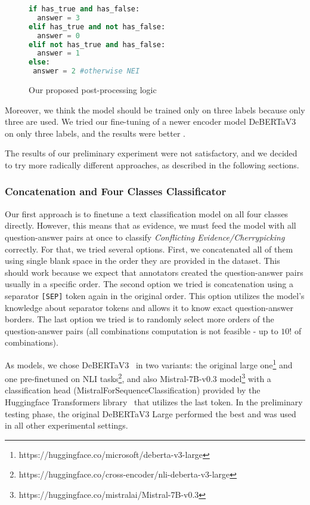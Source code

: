 \begin{figure}
    \begin{lstlisting}[language=Python, frame=single]
if has_true and has_false:
  answer = 3
elif has_true and not has_false:
  answer = 0
elif not has_true and has_false:
  answer = 1
else:
 answer = 2 #otherwise NEI
        \end{lstlisting}
    \caption{Our proposed post-processing logic} 
    \label{lst:post-processing}       
\end{figure}

Moreover, we think the model should be trained only on three labels because only three are used. We tried our fine-tuning of a newer encoder model DeBERTaV3~\cite{he2023debertav3improvingdebertausing} on only three labels, and the results were better .

The results of our preliminary experiment were not satisfactory, and we decided to try more radically different approaches, as described in the following sections.

\subsubsection*{Concatenation and Four Classes Classificator}
Our first approach is to finetune a text classification model on all four classes directly. However, this means that as evidence, we must feed the model with all question-answer pairs at once to classify \textit{Conflicting Evidence/Cherrypicking} correctly. For that, we tried several options. First, we concatenated all of them using single blank space in the order they are provided in the dataset. This should work because we expect that annotators created the question-answer pairs usually in a specific order. The second option we tried is concatenation using a separator \texttt{[SEP]} token again in the original order. This option utilizes the model's knowledge about separator tokens and allows it to know exact question-answer borders. The last option we tried is to randomly select more orders of the question-answer pairs (all combinations computation is not feasible - up to $10!$ of combinations).

As models, we chose DeBERTaV3~\cite{he2023debertav3improvingdebertausing} in two variants: the original large one\footnote{https://huggingface.co/microsoft/deberta-v3-large} and one pre-finetuned on NLI tasks\footnote{https://huggingface.co/cross-encoder/nli-deberta-v3-large}, and also Mistral-7B-v0.3 model\footnote{https://huggingface.co/mistralai/Mistral-7B-v0.3} with a classification head (MistralForSequenceClassification) provided by the Huggingface Transformers library~\cite{wolf-etal-2020-transformers} that utilizes the last token. In the preliminary testing phase, the original DeBERTaV3 Large performed the best and was used in all other experimental settings.


